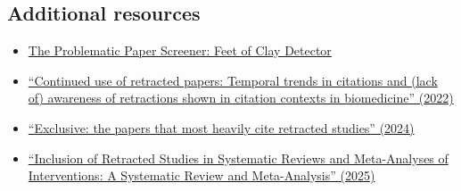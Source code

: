 \documentclass[letterpaper, 12pt]{article}
\begin{document}

\subsection*{Additional resources}

\begin{itemize}
    \setlength\itemsep{-0.5em}
    \item \href{https://dbrech.irit.fr/pls/apex/f?p=9999:31::::::}{The Problematic Paper Screener: Feet of Clay Detector}
    \item \href{https://direct.mit.edu/qss/article/2/4/1144/107356/Continued-use-of-retracted-papers-Temporal-trends}{``Continued use of retracted papers: Temporal trends in citations and (lack of) awareness of retractions shown in citation contexts in biomedicine'' (2022)}
    \item \href{https://doi.org/10.1378/chest.11-0523}{``Exclusive: the papers that most heavily cite retracted studies'' (2024)}
    \item \href{https://jamanetwork.com/journals/jamainternalmedicine/article-abstract/2831911}{``Inclusion of Retracted Studies in Systematic Reviews and Meta-Analyses of Interventions: A Systematic Review and Meta-Analysis'' (2025)}
\end{itemize}
\end{document}

